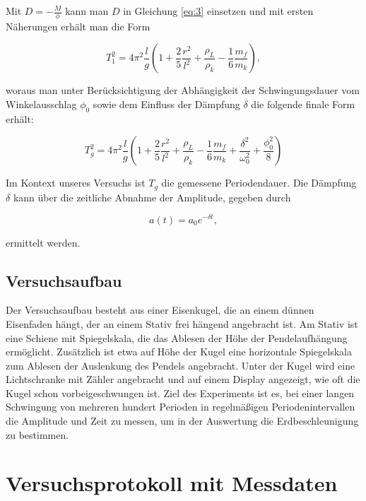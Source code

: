 \documentclass{article}
\begin{document}
Mit $D=-\frac{M}{\phi}$ kann man $D$ in Gleichung \ref{eq:3} einsetzen und mit ersten Näherungen erhält man die Form

\begin{equation}
    T_1^2 = 4\pi^2 \frac{l}{g} \left( 1+\frac{2}{5}\frac{r^2}{l^2}+\frac{\rho_L}{\rho_k}-\frac{1}{6}\frac{m_f}{m_k} \right),
\end{equation}

woraus man unter Berücksichtigung der Abhängigkeit der Schwingungsdauer vom Winkelausschlag $\phi_0$ sowie dem Einfluss der Dämpfung $\delta$ die folgende finale Form erhält:

\begin{equation}
    T_g^2 = 4\pi^2 \frac{l}{g} \left( 1+\frac{2}{5}\frac{r^2}{l^2}+\frac{\rho_L}{\rho_k}-\frac{1}{6}\frac{m_f}{m_k}+\frac{\delta^2}{\omega_0^2}+\frac{\phi_0^2}{8} \right)
    \label{eq:8}
\end{equation}

Im Kontext unseres Versuchs ist $T_g$ die gemessene Periodendauer. Die Dämpfung $\delta$ kann über die zeitliche Abnahme der Amplitude, gegeben durch

\begin{equation}
    a(t) = a_0 e^{-\delta t},
 \end{equation}

ermittelt werden.

\subsection{Versuchsaufbau}

Der Versuchsaufbau besteht aus einer Eisenkugel, die an einem dünnen Eisenfaden hängt, der an einem Stativ frei hängend angebracht ist. Am Stativ ist eine Schiene mit Spiegelskala, die das Ablesen der Höhe der Pendelaufhängung ermöglicht. Zusätzlich ist etwa auf Höhe der Kugel eine horizontale Spiegelskala zum Ablesen der Auslenkung des Pendels angebracht. Unter der Kugel wird eine Lichtschranke mit Zähler angebracht und auf einem Display angezeigt, wie oft die Kugel schon vorbeigeschwungen ist. Ziel des Experiments ist es, bei einer langen Schwingung von mehreren hundert Perioden in regelmäßigen Periodenintervallen die Amplitude und Zeit zu messen, um in der Auswertung die Erdbeschleunigung zu bestimmen. 

\newpage

\section{Versuchsprotokoll mit Messdaten}
\end{document}
